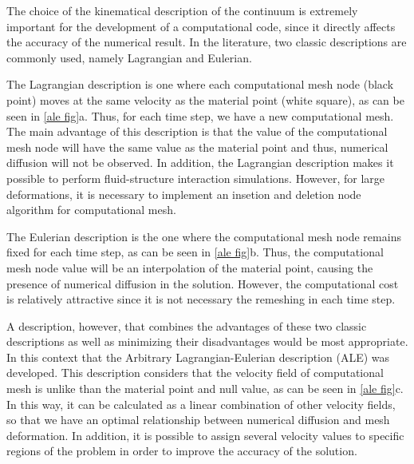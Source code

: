 The choice of the kinematical description of the continuum is 
extremely important for the development of a computational code, 
since it directly affects the accuracy of the numerical result. 
In the literature, two classic descriptions are commonly used, 
namely Lagrangian and Eulerian.

\medskip
The Lagrangian description is one where each computational mesh node (black point) 
moves at the same velocity as the material point (white square), as can be seen in
\ref{ale fig}a. Thus, for each time step, we have a new computational mesh. 
The main advantage of this description is that the value of the 
computational mesh node will have the same value as the material point
 and thus, numerical diffusion will not be observed. In addition, 
the Lagrangian description makes it possible to perform 
fluid-structure interaction simulations. However, for large 
deformations, it is necessary to implement an insetion and deletion
node algorithm for computational mesh.

\medskip
The Eulerian description is the one where the computational mesh node 
remains fixed for each time step, as can be seen in \ref{ale fig}b.
Thus, the computational mesh node value will be an interpolation 
of the material point, causing the presence of numerical diffusion 
in the solution. However, the computational cost is relatively 
attractive since it is not necessary the remeshing in each time step.

\medskip
A description, however, that combines the advantages of these two 
classic descriptions as well as minimizing their disadvantages would be
most appropriate. In this context that the Arbitrary 
Lagrangian-Eulerian description (ALE) was developed. 
This description considers that the velocity field of computational 
mesh is unlike than the material point and null value, as can be seen 
in \ref{ale fig}c. In this way, it can be calculated as a 
linear combination of other velocity fields, so that we have an 
optimal relationship between numerical diffusion and mesh deformation. 
In addition, it is possible to assign several velocity values to 
specific regions of the problem in order to improve the 
accuracy of the solution.



